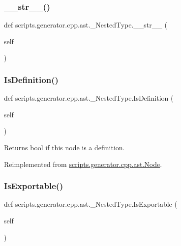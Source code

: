 \subsubsection{\texorpdfstring{\_\_str\_\_()}{\_\_str\_\_()}}
{\footnotesize\ttfamily def scripts.\+generator.\+cpp.\+ast.\+\_\+\+Nested\+Type.\+\_\+\+\_\+str\+\_\+\+\_\+ (\begin{DoxyParamCaption}\item[{}]{self }\end{DoxyParamCaption})}

\mbox{\label{classscripts_1_1generator_1_1cpp_1_1ast_1_1___nested_type_a546b1a780b8e69d244741b8245afe24e}} 
\subsubsection{\texorpdfstring{IsDefinition()}{IsDefinition()}}
{\footnotesize\ttfamily def scripts.\+generator.\+cpp.\+ast.\+\_\+\+Nested\+Type.\+Is\+Definition (\begin{DoxyParamCaption}\item[{}]{self }\end{DoxyParamCaption})}

\begin{DoxyVerb}Returns bool if this node is a definition.\end{DoxyVerb}
 

Reimplemented from \mbox{\hyperlink{classscripts_1_1generator_1_1cpp_1_1ast_1_1_node_a53663c2acef5d6954d065e11d2fd53a1}{scripts.\+generator.\+cpp.\+ast.\+Node}}.

\mbox{\label{classscripts_1_1generator_1_1cpp_1_1ast_1_1___nested_type_a0fc2d545ab6fbdbd9de1e5674ce923c6}} 
\subsubsection{\texorpdfstring{IsExportable()}{IsExportable()}}
{\footnotesize\ttfamily def scripts.\+generator.\+cpp.\+ast.\+\_\+\+Nested\+Type.\+Is\+Exportable (\begin{DoxyParamCaption}\item[{}]{self }\end{DoxyParamCaption})}

